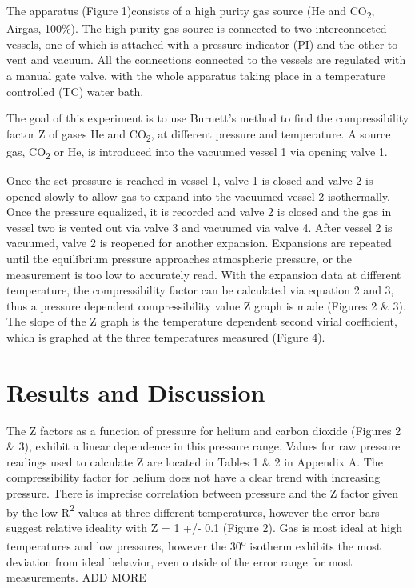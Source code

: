 \documentclass{article}
\begin{document}
The apparatus (Figure 1)consists of a high purity gas source (He and CO\textsubscript{2}, Airgas, 100\%). The high purity gas source is connected to two interconnected vessels, one of which is attached with a pressure indicator (PI) and the other to vent and vacuum. All the connections connected to the vessels are regulated with a manual gate valve, with the whole apparatus taking place in a temperature controlled (TC) water bath.%

The goal of this experiment is to use Burnett's method to find the compressibility factor Z of gases He and CO\textsubscript{2}, at different pressure and temperature. A source gas, CO\textsubscript{2} or He, is introduced into the vacuumed vessel 1 via opening valve 1. %

Once the set pressure is reached in vessel 1, valve 1 is closed and valve 2 is opened slowly to allow gas to expand into the vacuumed vessel 2 isothermally. Once the pressure equalized, it is recorded and valve 2 is closed and the gas in vessel two is vented out via valve 3 and vacuumed via valve 4. After vessel 2 is vacuumed, valve 2 is reopened for another expansion. Expansions are repeated until the equilibrium pressure approaches atmospheric pressure, or the measurement is too low to accurately read.
\linebreak \noindent With the expansion data at different temperature, the compressibility factor can be calculated via equation 2 and 3, thus a pressure dependent compressibility value Z graph is made (Figures 2 \& 3). The slope of the Z graph is the temperature dependent second virial coefficient, which is graphed at the three temperatures measured (Figure 4).  

\section*{Results and Discussion}
The Z factors as a function of pressure for helium and carbon dioxide (Figures 2 \& 3), exhibit a linear dependence in this pressure range. Values for raw pressure readings used to calculate Z are located in Tables 1 \& 2 in Appendix A. The compressibility factor for helium does not have a clear trend with increasing pressure. There is imprecise correlation between pressure and the Z factor given by the low R{\textsuperscript{2}} values at three different temperatures, however the error bars suggest relative ideality with Z = 1 +/- 0.1 (Figure 2). \linebreak Gas is most ideal at high temperatures and low pressures, however the 30{\textsuperscript{o}} isotherm exhibits the most deviation from ideal behavior, even outside of the error range for most measurements. ADD MORE
\end{document}
